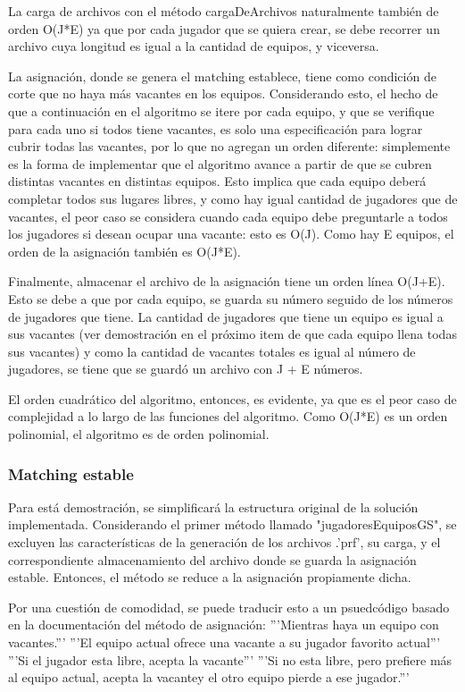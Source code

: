\documentclass[article,a4paper]{article}
\begin{document}
La carga de archivos con el método cargaDeArchivos naturalmente también de orden O(J*E) ya que por cada jugador que se quiera crear, se debe recorrer un archivo cuya longitud es igual a la cantidad de equipos, y viceversa.

La asignación, donde se genera el matching establece, tiene como condición de corte que no haya más vacantes en los equipos. Considerando esto, el hecho de que a continuación en el algoritmo se itere por cada equipo, y que se verifique para cada uno si todos tiene vacantes, es solo una especificación para lograr cubrir todas las vacantes, por lo que no agregan un orden diferente: simplemente es la forma de implementar que el algoritmo avance a partir de que se cubren distintas vacantes en distintas equipos. Esto implica que cada equipo deberá completar todos sus lugares libres, y como hay igual cantidad de jugadores que de vacantes, el peor caso se considera cuando cada equipo debe preguntarle a todos los jugadores si desean ocupar una vacante: esto es O(J). Como hay E equipos, el orden de la asignación también es O(J*E).

Finalmente, almacenar el archivo de la asignación tiene un orden línea O(J+E). Esto se debe a que por cada equipo, se guarda su número seguido de los números de jugadores que tiene. La cantidad de jugadores que tiene un equipo es igual a sus vacantes (ver demostración en el próximo item de que cada equipo llena todas sus vacantes) y como la cantidad de vacantes totales es igual al número de jugadores, se tiene que se guardó un archivo con J + E números.

El orden cuadrático del algoritmo, entonces, es evidente, ya que es el peor caso de complejidad a lo largo de las funciones del algoritmo. Como O(J*E) es un orden polinomial, el algoritmo es de orden polinomial.

\subsubsection{Matching estable}

Para está demostración, se simplificará la estructura original de la solución implementada. Considerando el primer método llamado "jugadoresEquiposGS", se excluyen las características de la generación de los archivos .'prf', su carga, y el correspondiente almacenamiento del archivo donde se guarda la asignación estable. Entonces, el método se reduce a la asignación propiamente dicha.

Por una cuestión de comodidad, se puede traducir esto a un psuedcódigo basado en la documentación del método de asignación:
'''Mientras haya un equipo con vacantes.'''
    '''El equipo actual ofrece una vacante a su jugador favorito actual'''
        '''Si el jugador esta libre, acepta la vacante'''
              '''Si no esta libre, pero prefiere más al equipo actual, acepta la vacantey el otro equipo pierde a ese jugador.'''
\end{document}

